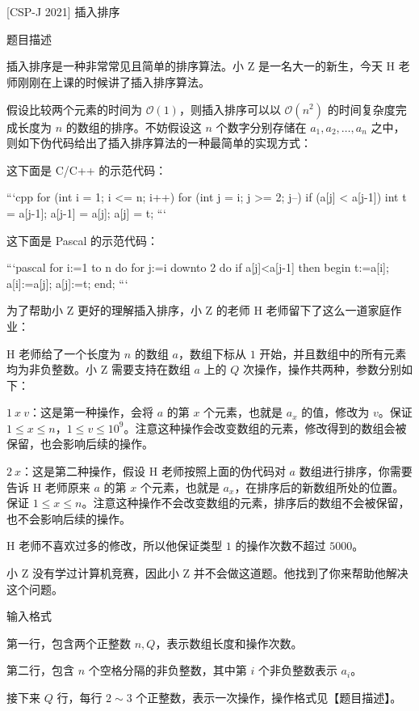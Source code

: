 \documentclass[12pt,twiside,a4paper]{ctexbook}
\numberwithin{chapter}{part}
\begin{document}
\section{}
 [CSP-J 2021] 插入排序

 题目描述

插入排序是一种非常常见且简单的排序算法。小 Z 是一名大一的新生，今天 H 老师刚刚在上课的时候讲了插入排序算法。

假设比较两个元素的时间为 $\mathcal O(1)$，则插入排序可以以 $\mathcal O(n^2)$ 的时间复杂度完成长度为 $n$ 的数组的排序。不妨假设这 $n$ 个数字分别存储在 $a_1, a_2, \ldots, a_n$ 之中，则如下伪代码给出了插入排序算法的一种最简单的实现方式：

这下面是 C/C++ 的示范代码：

```cpp
for (int i = 1; i <= n; i++)
	for (int j = i; j >= 2; j--)
		if (a[j] < a[j-1]) {
			int t = a[j-1];
			a[j-1] = a[j];
			a[j] = t;
		}
```

这下面是 Pascal 的示范代码：

```pascal
for i:=1 to n do
	for j:=i downto 2 do
		if a[j]<a[j-1] then
			begin
				t:=a[i];
				a[i]:=a[j];
				a[j]:=t;
			end;
```

为了帮助小 Z 更好的理解插入排序，小 Z 的老师 H 老师留下了这么一道家庭作业：

H 老师给了一个长度为 $n$ 的数组 $a$，数组下标从 $1$ 开始，并且数组中的所有元素均为非负整数。小 Z 需要支持在数组 $a$ 上的 $Q$ 次操作，操作共两种，参数分别如下：

$1~x~v$：这是第一种操作，会将 $a$ 的第 $x$ 个元素，也就是 $a_x$ 的值，修改为 $v$。保证 $1 \le x \le n$，$1 \le v \le 10^9$。注意这种操作会改变数组的元素，修改得到的数组会被保留，也会影响后续的操作。

$2~x$：这是第二种操作，假设 H 老师按照上面的伪代码对 $a$ 数组进行排序，你需要告诉 H 老师原来 $a$ 的第 $x$ 个元素，也就是 $a_x$，在排序后的新数组所处的位置。保证 $1 \le x \le n$。注意这种操作不会改变数组的元素，排序后的数组不会被保留，也不会影响后续的操作。

H 老师不喜欢过多的修改，所以他保证类型 $1$ 的操作次数不超过 $5000$。

小 Z 没有学过计算机竞赛，因此小 Z 并不会做这道题。他找到了你来帮助他解决这个问题。

 输入格式

第一行，包含两个正整数 $n, Q$，表示数组长度和操作次数。

第二行，包含 $n$ 个空格分隔的非负整数，其中第 $i$ 个非负整数表示 $a_i$。

接下来 $Q$ 行，每行 $2 \sim 3$ 个正整数，表示一次操作，操作格式见【题目描述】。
\end{document}
